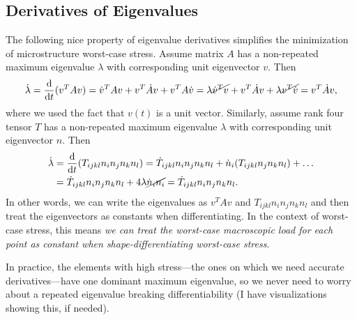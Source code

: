 \documentclass[10pt]{article}
\providecommand{\tder}[2]{\frac{\mathrm{d} #1}{\mathrm{d} #2}}
\begin{document}
\subsection{Derivatives of Eigenvalues}
\label{sec:eigen_deriv}
The following nice property of eigenvalue derivatives simplifies the
minimization of microstructure worst-case stress. Assume matrix $A$ has a
non-repeated maximum eigenvalue $\lambda$ with corresponding unit eigenvector
$v$.
Then
$$
\dot \lambda = \tder{}{t} (v^T A v ) = \dot v^T A v + v^T \dot A v + v^T A \dot v = \lambda \cancel{\dot v^T v} + v^T \dot A v + \lambda \cancel{v^T \dot v} = v^T \dot A v,
$$
where we used the fact that $v(t)$ is a unit vector.
Similarly, assume rank four tensor $T$ has a non-repeated maximum eigenvalue
$\lambda$ with corresponding unit eigenvector $n$. Then
\begin{align*}
    \dot \lambda &= \tder{}{t} (T_{ijkl} n_i n_j n_k n_l) = \dot{T}_{ijkl} n_i n_j n_k n_l + \dot n_i (T_{ijkl} n_j n_k n_l) + \dots  \\
    &= \dot{T}_{ijkl} n_i n_j n_k n_l + 4 \lambda \cancel{\dot n_i n_i} = \dot{T}_{ijkl} n_i n_j n_k n_l.
\end{align*}
In other words, we can write the eigenvalues as $v^T A v$ and $T_{ijkl} n_i n_j n_k n_l$ and
then treat the eigenvectors as constants when differentiating. In the context
of worst-case stress, this means {\em we can treat the worst-case macroscopic load
for each point as constant when shape-differentiating worst-case stress}.

In practice, the elements with high stress---the ones on which we need accurate
derivatives---have one dominant maximum eigenvalue, so we never
need to worry about a repeated eigenvalue breaking differentiability (I have
visualizations showing this, if needed).
\end{document}
